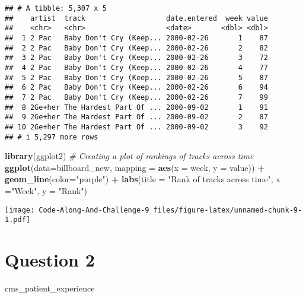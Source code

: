 \documentclass[
]{article}
\newenvironment{Shaded}{\begin{snugshade}}{\end{snugshade}}
\newcommand{\AttributeTok}[1]{\textcolor[rgb]{0.13,0.29,0.53}{#1}}
\newcommand{\CommentTok}[1]{\textcolor[rgb]{0.56,0.35,0.01}{\textit{#1}}}
\newcommand{\FunctionTok}[1]{\textcolor[rgb]{0.13,0.29,0.53}{\textbf{#1}}}
\newcommand{\NormalTok}[1]{#1}
\newcommand{\SpecialCharTok}[1]{\textcolor[rgb]{0.81,0.36,0.00}{\textbf{#1}}}
\newcommand{\StringTok}[1]{\textcolor[rgb]{0.31,0.60,0.02}{#1}}
\begin{document}
\begin{verbatim}
## # A tibble: 5,307 x 5
##    artist  track                   date.entered  week value
##    <chr>   <chr>                   <date>       <dbl> <dbl>
##  1 2 Pac   Baby Don't Cry (Keep... 2000-02-26       1    87
##  2 2 Pac   Baby Don't Cry (Keep... 2000-02-26       2    82
##  3 2 Pac   Baby Don't Cry (Keep... 2000-02-26       3    72
##  4 2 Pac   Baby Don't Cry (Keep... 2000-02-26       4    77
##  5 2 Pac   Baby Don't Cry (Keep... 2000-02-26       5    87
##  6 2 Pac   Baby Don't Cry (Keep... 2000-02-26       6    94
##  7 2 Pac   Baby Don't Cry (Keep... 2000-02-26       7    99
##  8 2Ge+her The Hardest Part Of ... 2000-09-02       1    91
##  9 2Ge+her The Hardest Part Of ... 2000-09-02       2    87
## 10 2Ge+her The Hardest Part Of ... 2000-09-02       3    92
## # i 5,297 more rows
\end{verbatim}

\begin{Shaded}
\begin{Highlighting}[]
\FunctionTok{library}\NormalTok{(ggplot2)}
\CommentTok{\# Creating a plot of rankings of tracks across time}
\FunctionTok{ggplot}\NormalTok{(}\AttributeTok{data=}\NormalTok{billboard\_new, }
       \AttributeTok{mapping =} \FunctionTok{aes}\NormalTok{(}\AttributeTok{x =}\NormalTok{ week,}
                     \AttributeTok{y =}\NormalTok{ value)) }\SpecialCharTok{+} 
         \FunctionTok{geom\_line}\NormalTok{(}\AttributeTok{color=}\StringTok{"purple"}\NormalTok{) }\SpecialCharTok{+}
         \FunctionTok{labs}\NormalTok{(}\AttributeTok{title =} \StringTok{"Rank of tracks across time"}\NormalTok{,}
              \AttributeTok{x =}\StringTok{"Week"}\NormalTok{, }
              \AttributeTok{y =} \StringTok{"Rank"}\NormalTok{)}
\end{Highlighting}
\end{Shaded}

\texttt{[image: Code-Along-And-Challenge-9\_files/figure-latex/unnamed-chunk-9-1.pdf]}

\hypertarget{question-2}{%
\section{Question 2}\label{question-2}}

\begin{Shaded}
\begin{Highlighting}[]
\NormalTok{cms\_patient\_experience}
\end{Highlighting}
\end{Shaded}
\end{document}
